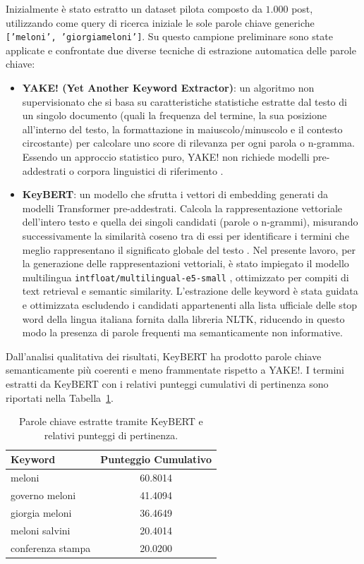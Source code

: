 \documentclass[11pt]{article}
\begin{document}
Inizialmente è stato estratto un dataset pilota composto da $1.000$ post, utilizzando come query di ricerca iniziale le sole parole chiave generiche \texttt{['meloni', 'giorgiameloni']}. Su questo campione preliminare sono state applicate e confrontate due diverse tecniche di estrazione automatica delle parole chiave:
\begin{itemize}
    \item \textbf{YAKE! (Yet Another Keyword Extractor)}: un algoritmo non supervisionato che si basa su caratteristiche statistiche estratte dal testo di un singolo documento (quali la frequenza del termine, la sua posizione all'interno del testo, la formattazione in maiuscolo/minuscolo e il contesto circostante) per calcolare uno score di rilevanza per ogni parola o n-gramma. Essendo un approccio statistico puro, YAKE! non richiede modelli pre-addestrati o corpora linguistici di riferimento \cite{campos2020yake}.
    \item \textbf{KeyBERT}: un modello che sfrutta i vettori di embedding generati da modelli Transformer pre-addestrati. Calcola la rappresentazione vettoriale dell'intero testo e quella dei singoli candidati (parole o n-grammi), misurando successivamente la similarità coseno tra di essi per identificare i termini che meglio rappresentano il significato globale del testo \cite{grootendorst2020keybert}. Nel presente lavoro, per la generazione delle rappresentazioni vettoriali, è stato impiegato il modello multilingua \texttt{intfloat/multilingual-e5-small} \cite{wang2022text}, ottimizzato per compiti di text retrieval e semantic similarity. L'estrazione delle keyword è stata guidata e ottimizzata escludendo i candidati appartenenti alla lista ufficiale delle stop word della lingua italiana fornita dalla libreria NLTK, riducendo in questo modo la presenza di parole frequenti ma semanticamente non informative.
\end{itemize}

Dall'analisi qualitativa dei risultati, KeyBERT ha prodotto parole chiave semanticamente più coerenti e meno frammentate rispetto a YAKE!. I termini estratti da KeyBERT con i relativi punteggi cumulativi di pertinenza sono riportati nella Tabella~\ref{tab:keywords}.

\begin{table}[htbp]
\centering
\begin{tabular}{lc}
\hline
\textbf{Keyword} & \textbf{Punteggio Cumulativo} \\ \hline
meloni & 60.8014 \\
governo meloni & 41.4094 \\
giorgia meloni & 36.4649 \\
meloni salvini & 20.4014 \\
conferenza stampa & 20.0200 \\ \hline
\end{tabular}
\caption{Parole chiave estratte tramite KeyBERT e relativi punteggi di pertinenza.}
\label{tab:keywords}
\end{table}
\end{document}
